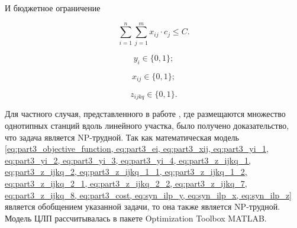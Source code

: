 И бюджетное ограничение

\begin{equation}
  \label{eq:part3_cost}
  \sum\limits_{i=1}^n \sum\limits_{j=1}^m x_{ij} \cdot c_j \leq C.
\end{equation}

\begin{equation}
    \label{eq:syn_ilp_y}
    y_i \in \{0, 1\};
\end{equation}

\begin{equation}
    \label{eq:syn_ilp_x}
    x_{ij} \in \{0, 1\};
\end{equation}

\begin{equation}
    \label{eq:syn_ilp_z}
    z_{ijkq} \in \{0, 1\}.
\end{equation}


Для частного случая, представленного в работе \cite{Ivanov2018}, где размещаются множество однотипных станций вдоль линейного участка, было получено доказательство, что задача является NP-трудной. Так как математическая модель \cref{eq:part3_objective_function, eq:part3_ei, eq:part3_xij, eq:part3_yi_1, eq:part3_yi_2, eq:part3_yi_3, eq:part3_yi_4, eq:part3_z_ijkq_1, eq:part3_z_ijkq_2, eq:part3_z_ijkq_1_1, eq:part3_z_ijkq_1_2, eq:part3_z_ijkq_2_1, eq:part3_z_ijkq_2_2, eq:part3_z_ijkq_7, eq:part3_z_ijkq_8, eq:part3_cost, eq:syn_ilp_y, eq:syn_ilp_x, eq:syn_ilp_z} является обобщением указанной задачи, то  она также является NP-трудной. Модель ЦЛП рассчитывалась в пакете Optimization Toolbox MATLAB.



